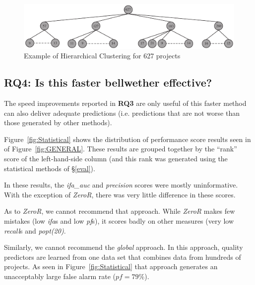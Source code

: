 \documentclass[10pt,journal,compsoc]{IEEEtran}
\newcommand{\fig}[1]{Figure~\ref{fig:#1}}
\begin{document}
\begin{figure}[!t]
    \centering
    \includegraphics[width=\linewidth]{figs/bubble.pdf}
    \caption{Example of Hierarchical Clustering for 627 projects}
    \label{fig:example tree}
\end{figure}



 

\subsection*{RQ4: Is this faster bellwether effective?}
\label{sec:rq4}

The speed improvements reported in {\bf RQ3} are only useful
of this faster method can also deliver adequate predictions
(i.e. predictions that are not worse
than those generated by other methods).

 
Figure~\ref{fig:Statistical} shows the distribution of
performance score results seen in
of \fig{GENERAL}. These results are grouped together by the ``rank'' score
of the left-hand-side column 
(and this rank was generated using the statistical methods of
\S\ref{eval}).


In these results, the {\em ifa\_auc}  and {\em precision} scores
were mostly uninformative. With the exception of {\em ZeroR},
there was very little difference in these scores.

As to {\em ZeroR}, we cannot recommend that approach.
While {\em ZeroR} 
makes few mistakes (low {\em ifa}s and low {\em pf}s), it scores badly
on   other measures (very low {\em recall}s  and {\em popt(20)}.

Similarly, we cannot recommend the    {\em global} approach.
In this approach, quality predictors are learned from   one data set that combines
data from hundreds of projects. As seen in Figure~\ref{fig:Statistical} 
that approach generates an unacceptably large false alarm rate ($pf=79\%$).
\end{document}
